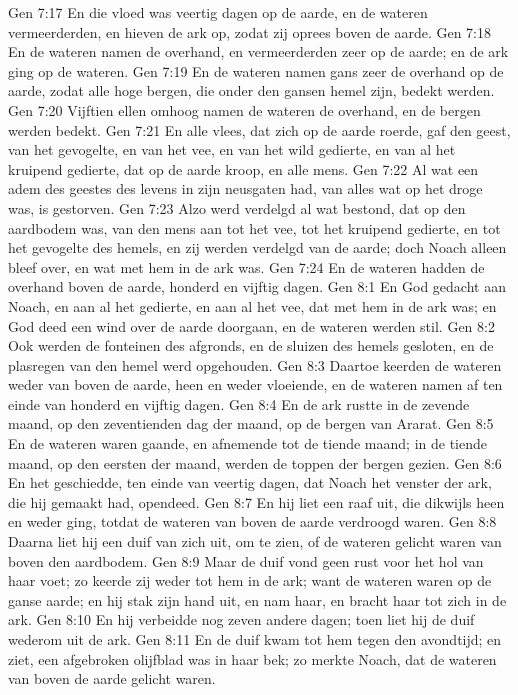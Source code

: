 Gen 7:17  En die vloed was veertig dagen op de aarde, en de wateren vermeerderden, en hieven de ark op, zodat zij oprees boven de aarde.
Gen 7:18  En de wateren namen de overhand, en vermeerderden zeer op de aarde; en de ark ging op de wateren.
Gen 7:19  En de wateren namen gans zeer de overhand op de aarde, zodat alle hoge bergen, die onder den gansen hemel zijn, bedekt werden.
Gen 7:20  Vijftien ellen omhoog namen de wateren de overhand, en de bergen werden bedekt.
Gen 7:21  En alle vlees, dat zich op de aarde roerde, gaf den geest, van het gevogelte, en van het vee, en van het wild gedierte, en van al het kruipend gedierte, dat op de aarde kroop, en alle mens.
Gen 7:22  Al wat een adem des geestes des levens in zijn neusgaten had, van alles wat op het droge was, is gestorven.
Gen 7:23  Alzo werd verdelgd al wat bestond, dat op den aardbodem was, van den mens aan tot het vee, tot het kruipend gedierte, en tot het gevogelte des hemels, en zij werden verdelgd van de aarde; doch Noach alleen bleef over, en wat met hem in de ark was.
Gen 7:24  En de wateren hadden de overhand boven de aarde, honderd en vijftig dagen.
Gen 8:1  En God gedacht aan Noach, en aan al het gedierte, en aan al het vee, dat met hem in de ark was; en God deed een wind over de aarde doorgaan, en de wateren werden stil.
Gen 8:2  Ook werden de fonteinen des afgronds, en de sluizen des hemels gesloten, en de plasregen van den hemel werd opgehouden.
Gen 8:3  Daartoe keerden de wateren weder van boven de aarde, heen en weder vloeiende, en de wateren namen af ten einde van honderd en vijftig dagen.
Gen 8:4  En de ark rustte in de zevende maand, op den zeventienden dag der maand, op de bergen van Ararat.
Gen 8:5  En de wateren waren gaande, en afnemende tot de tiende maand; in de tiende maand, op den eersten der maand, werden de toppen der bergen gezien.
Gen 8:6  En het geschiedde, ten einde van veertig dagen, dat Noach het venster der ark, die hij gemaakt had, opendeed.
Gen 8:7  En hij liet een raaf uit, die dikwijls heen en weder ging, totdat de wateren van boven de aarde verdroogd waren.
Gen 8:8  Daarna liet hij een duif van zich uit, om te zien, of de wateren gelicht waren van boven den aardbodem.
Gen 8:9  Maar de duif vond geen rust voor het hol van haar voet; zo keerde zij weder tot hem in de ark; want de wateren waren op de ganse aarde; en hij stak zijn hand uit, en nam haar, en bracht haar tot zich in de ark.
Gen 8:10  En hij verbeidde nog zeven andere dagen; toen liet hij de duif wederom uit de ark.
Gen 8:11  En de duif kwam tot hem tegen den avondtijd; en ziet, een afgebroken olijfblad was in haar bek; zo merkte Noach, dat de wateren van boven de aarde gelicht waren.
